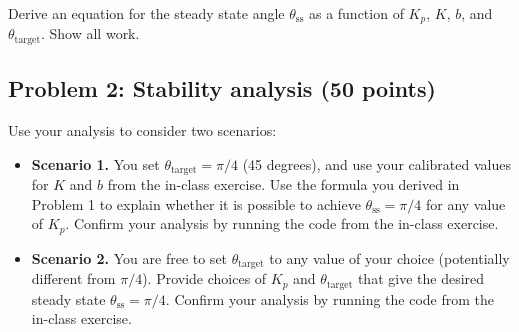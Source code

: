 \documentclass[12pt]{article}
\begin{document}
Derive an equation for the steady state angle $\theta_{\text{ss}}$ as a function of $K_p$, $K$, $b$, and $\theta_{\text{target}}$. Show all work.

\subsection*{Problem 2: Stability analysis (50 points)}

Use your analysis to consider two scenarios:
\begin{itemize}
\item \textbf{Scenario 1.} You set $\theta_{\text{target}} = \pi/4$ (45 degrees), and use your calibrated values for $K$ and $b$ from the in-class exercise. Use the formula you derived in Problem 1 to explain whether it is possible to achieve $\theta_{\text{ss}} = \pi/4$ for any value of $K_p$. Confirm your analysis by running the code from the in-class exercise.
\item \textbf{Scenario 2.} You are free to set $\theta_{\text{target}}$ to any value of your choice (potentially different from $\pi/4$). Provide choices of $K_p$ and $\theta_{\text{target}}$ that give the desired steady state $\theta_{\text{ss}} = \pi/4$. Confirm your analysis by running the code from the in-class exercise.
\end{itemize}
\end{document}
